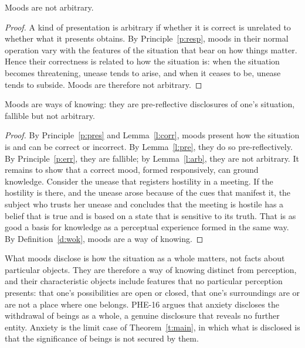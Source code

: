 \documentclass{situationist-preprint}
\begin{document}
\begin{lemma}\label{l:arb}
Moods are not arbitrary.
\end{lemma}

\begin{proof}
A kind of presentation is arbitrary if whether it is correct is unrelated to whether what it presents obtains. By Principle~\ref{p:resp}, moods in their normal operation vary with the features of the situation that bear on how things matter. Hence their correctness is related to how the situation is: when the situation becomes threatening, unease tends to arise, and when it ceases to be, unease tends to subside. Moods are therefore not arbitrary.
\end{proof}

\begin{theorem}\label{t:main}
Moods are ways of knowing: they are pre-reflective disclosures of one's situation, fallible but not arbitrary.
\end{theorem}

\begin{proof}
By Principle~\ref{p:pres} and Lemma~\ref{l:corr}, moods present how the situation is and can be correct or incorrect. By Lemma~\ref{l:pre}, they do so pre-reflectively. By Principle~\ref{p:err}, they are fallible; by Lemma~\ref{l:arb}, they are not arbitrary. It remains to show that a correct mood, formed responsively, can ground knowledge. Consider the unease that registers hostility in a meeting. If the hostility is there, and the unease arose because of the cues that manifest it, the subject who trusts her unease and concludes that the meeting is hostile has a belief that is true and is based on a state that is sensitive to its truth. That is as good a basis for knowledge as a perceptual experience formed in the same way. By Definition~\ref{d:wok}, moods are a way of knowing.
\end{proof}

\begin{remark}\label{r:object}
What moods disclose is how the situation as a whole matters, not facts about particular objects. They are therefore a way of knowing distinct from perception, and their characteristic objects include features that no particular perception presents: that one's possibilities are open or closed, that one's surroundings are or are not a place where one belongs. PHE-16 argues that anxiety discloses the withdrawal of beings as a whole, a genuine disclosure that reveals no further entity. Anxiety is the limit case of Theorem~\ref{t:main}, in which what is disclosed is that the significance of beings is not secured by them.
\end{remark}
\end{document}
